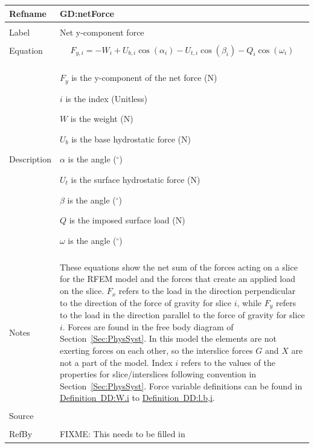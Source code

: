 \documentclass[12pt]{article}
\begin{document}
\noindent \begin{minipage}{\textwidth}
\begin{tabular}{p{} p{}}
\toprule \textbf{Refname} & \textbf{GD:netForce}
\label{GD:netForce}
\\ \midrule \\
Label & Net y-component force
\\ \midrule \\
Equation & \begin{dmath}
           {F_{y,i}}=-W_{i}+{U_{b,i}} \cos\left(α_{i}\right)-{U_{t,i}} \cos\left(β_{i}\right)-Q_{i} \cos\left(ω_{i}\right)
           \end{dmath}
\\ \midrule \\
Description & \begin{symbDescription}
              \item{${F_{y}}$ is the y-component of the net force (N)}
              \item{$i$ is the index (Unitless)}
              \item{$W$ is the weight (N)}
              \item{${U_{b}}$ is the base hydrostatic force (N)}
              \item{$α$ is the angle (${}^{\circ}$)}
              \item{${U_{t}}$ is the surface hydrostatic force (N)}
              \item{$β$ is the angle (${}^{\circ}$)}
              \item{$Q$ is the imposed surface load (N)}
              \item{$ω$ is the angle (${}^{\circ}$)}
              \end{symbDescription}
\\ \midrule \\
Notes & These equations show the net sum of the forces acting on a slice for the RFEM model and the forces that create an applied load on the slice. ${F_{x}}$ refers to the load in the direction perpendicular to the direction of the force of gravity for slice $i$, while ${F_{y}}$ refers to the load in the direction parallel to the force of gravity for slice $i$. Forces are found in the free body diagram of Section~\ref{Sec:PhysSyst}. In this model the elements are not exerting forces on each other, so the interslice forces $G$ and $X$ are not a part of the model. Index $i$ refers to the values of the properties for slice/interslices following convention in Section~\ref{Sec:PhysSyst}. Force variable definitions can be found in \hyperref[DD:W.i]{Definition~DD:W.i} to \hyperref[DD:l.b,i]{Definition~DD:l.b,i}.
\\ \midrule \\
Source &
\\ \midrule \\
RefBy & FIXME: This needs to be filled in
\\ \bottomrule \end{tabular}
\end{minipage}\\
\end{document}
